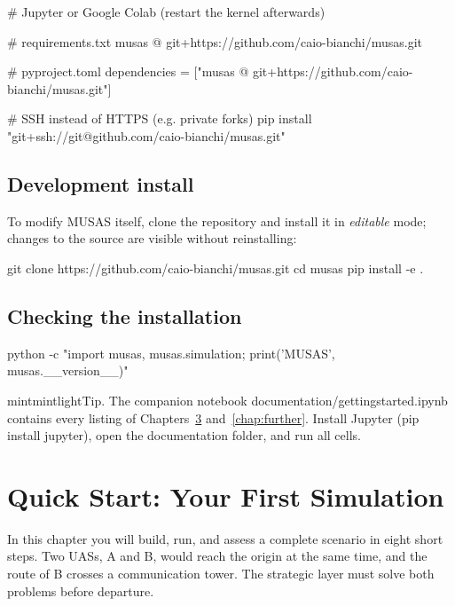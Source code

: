 \documentclass[11pt,a4paper,oneside]{report}
\newenvironment{tip}{\begin{callout}{mint}{mintlight}{\faLightbulb[regular]}{Tip.}}{\end{callout}}
\newcommand{\code}[1]{\textcolor{primary!85!black}{\ttfamily\def\_{\textunderscore\allowbreak}#1}}
\begin{document}
\begin{shell}
# Jupyter or Google Colab (restart the kernel afterwards)

# requirements.txt
musas @ git+https://github.com/caio-bianchi/musas.git

# pyproject.toml
dependencies = ["musas @ git+https://github.com/caio-bianchi/musas.git"]

# SSH instead of HTTPS (e.g. private forks)
pip install "git+ssh://git@github.com/caio-bianchi/musas.git"
\end{shell}

\section{Development install}

To modify MUSAS itself, clone the repository and install it in
\emph{editable} mode; changes to the source are visible without reinstalling:

\begin{shell}
git clone https://github.com/caio-bianchi/musas.git
cd musas
pip install -e .
\end{shell}

\section{Checking the installation}

\begin{shell}
python -c "import musas, musas.simulation; print('MUSAS', musas.__version__)"
\end{shell}

\begin{tip}
The companion notebook \code{documentation/getting\_started.ipynb} contains
every listing of Chapters~\ref{chap:quickstart} and~\ref{chap:further}.
Install Jupyter (\code{pip install jupyter}), open the \code{documentation}
folder, and run all cells.
\end{tip}

\chapter{Quick Start: Your First Simulation}
\label{chap:quickstart}

In this chapter you will build, run, and assess a complete scenario in eight
short steps. Two UASs, A and B, would reach the origin at the same time, and
the route of B crosses a communication tower. The strategic layer must solve
both problems before departure.
\end{document}

